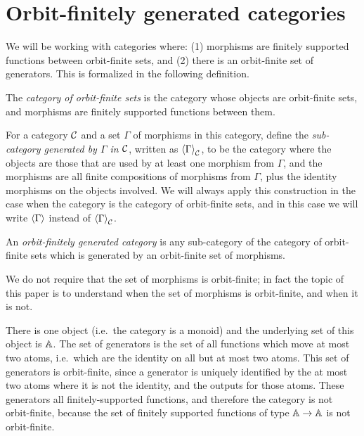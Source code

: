 
\section{Orbit-finitely generated categories}
\label{sec:orbit-finitely-generated-categories}
We will be working with categories where: (1) morphisms are finitely supported functions between orbit-finite sets, and (2) there is an orbit-finite set of generators. This is formalized in the following definition.

\begin{definition}
    The \emph{category of orbit-finite sets} is the category whose objects are orbit-finite sets, and morphisms are finitely supported functions between them.
\end{definition}

\newcommand{\generate}[1]{\tuple{#1}}

For a category ${\mathcal C}$ and a set $\Gamma$ of morphisms in this category, define the \emph{sub-category generated by $\Gamma$ in ${\mathcal C}$}, written as   ${\generate \Gamma}_{\Cc}$, to be the category where the objects are those that are used by at least one morphism from $\Gamma$, and the morphisms are all finite compositions of morphisms from $\Gamma$, plus the identity morphisms on the objects involved. We will always apply this construction in the case when the category is the category of orbit-finite sets, and in this case we will write $\generate \Gamma$ instead of ${\generate \Gamma}_{\Cc}$.


\begin{definition}
    \label{def:orbit-finitely-generated-category}
    An \emph{orbit-finitely generated category} is any sub-category of the category of orbit-finite sets which is generated by an orbit-finite set of morphisms.
\end{definition}

We do not require that the set of morphisms is orbit-finite; in fact the topic of this paper is to understand when the set of morphisms is orbit-finite, and when it is not.

\begin{myexample}[A monoid]
There is one object (i.e.~the category is a monoid) and the underlying set of this object is $\mathbb A$. The set of generators is the set of all functions which move at most two atoms, i.e.~which are the identity on all but at most two atoms. This set of generators is orbit-finite, since a generator is uniquely identified by the at most two atoms where it is not the identity, and the outputs for those atoms. These generators  all finitely-supported functions, and therefore the category is not orbit-finite, because the set of finitely supported functions of type $\mathbb A \to \mathbb A$ is not orbit-finite. 
\end{myexample}

